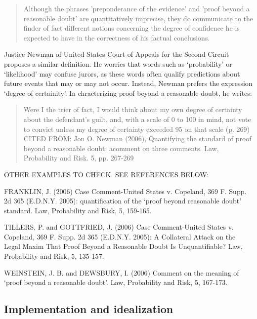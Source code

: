 \documentclass[10pt,dvipsnames,enabledeprecatedfontcommands]{scrartcl}
\begin{document}
\begin{quote}
Although the phrases 'preponderance of the evidence' and 'proof beyond a reasonable doubt' are quantitatively imprecise, they do communicate to the finder of fact different notions concerning the degree of confidence he is expected to have in the correctness of his factual conclusions.
\end{quote}

\noindent Justice Newman of United States Court of Appeals for the
Second Circuit proposes a similar definition. He worries that words such
as `probability' or `likelihood' may confuse jurors, as these words
often qualify predictions about future events that may or may not occur.
Instead, Newman prefers the expression `degree of certainity'. In
chracterizing proof beyond a reasonable doubt, he writes:

\begin{quote}
Were I the trier of fact, I would think about my own degree of certainty about the defendant's guilt, 
and, with a scale of 0 to 100 in mind, not vote to convict unless my degree of certainty 
exceeded 95 on that scale (p. 269) CITED FROM: Jon O. Newman (2006), Quantifying the standard of proof beyond a reasonable doubt: acomment on three comments. Law, Probability and Risk. 5, pp. 267-269
\end{quote}


OTHER EXAMPLES TO CHECK. SEE REFERENCES BELOW:

FRANKLIN, J. (2006) Case Comment-United States v. Copeland, 369 F. Supp.
2d 365 (E.D.N.Y. 2005): quantification of the `proof beyond reasonable
doubt' standard. Law, Probability and Risk, 5, 159-165.

TILLERS, P. and GOTTFRIED, J. (2006) Case Comment-United States v.
Copeland, 369 F. Supp. 2d 365 (E.D.N.Y. 2005): A Collateral Attack on
the Legal Maxim That Proof Beyond a Reasonable Doubt Is Unquantifiable?
Law, Probability and Risk, 5, 135-157.

WEINSTEIN, J. B. and DEWSBURY, I. (2006) Comment on the meaning of
`proof beyond a reasonable doubt'. Law, Probability and Risk, 5,
167-173.

\hypertarget{implementation-and-idealization}{%
\subsection{Implementation and
idealization}\label{implementation-and-idealization}}
\end{document}
